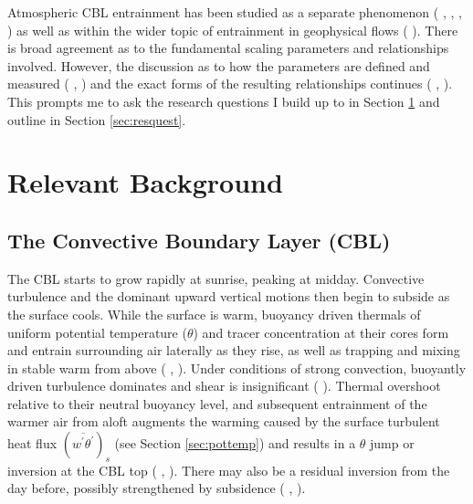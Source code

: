 Atmospheric \acs{CBL} entrainment has been studied as a separate phenomenon (\citeauthor{StullNelEl} \citeyear{StullNelEl}, \citeauthor{SullMoengStev} \citeyear{SullMoengStev}, \citeauthor{FedConzMir04} \citeyear{FedConzMir04}, \citeauthor{BrooksFowler2} \citeyear{BrooksFowler2}) as well as within the wider topic of entrainment in geophysical flows (\citeauthor{Turner86} \citeyear{Turner86}). There is broad agreement as to the fundamental scaling parameters and relationships involved.  However, the discussion as to how the parameters are defined and measured (\citeauthor{BrooksFowler2} \citeyear{BrooksFowler2}, \citeauthor{Traum11} \citeyear{Traum11}) and the exact forms of the resulting relationships continues (\citeauthor{SullMoengStev} \citeyear{SullMoengStev}, \citeauthor{FedConzMir04} \citeyear{FedConzMir04} \citeauthor{BrooksFowler2} \citeyear{BrooksFowler2}).  This prompts me to ask the research questions I build up to in Section \ref{sec:relback} and outline in Section \ref{sec:resquest}.


\section{Relevant Background}
\label{sec:relback}
\subsection{The Convective Boundary Layer (CBL)}

The \acs{CBL} starts to grow rapidly at sunrise, peaking at midday.  Convective turbulence and the dominant upward vertical motions then begin to subside as the surface cools.  While the surface is warm, buoyancy driven thermals of uniform potential temperature ($\theta$) and tracer concentration at their cores form and entrain surrounding air laterally as they rise, as well as trapping and mixing in stable warm from above (\citeauthor{Stull-BLMetIntro} \citeyear{Stull-BLMetIntro}, \citeauthor{CrumStullEl} \citeyear{CrumStullEl}).  Under conditions of strong convection, buoyantly driven turbulence dominates and shear is insignificant (\citeauthor{DirLEddy} \citeyear{DirLEddy}). Thermal overshoot relative to their neutral buoyancy level, and subsequent entrainment of the warmer air from aloft augments the warming caused by the surface turbulent heat flux $(\overline{w^{'}\theta^{'}})_{s}$ (see Section \ref{sec:pottemp}) and results in a $\theta$ jump or inversion at the \acs{CBL} top (\citeauthor{SchmidtSchu} \citeyear{SchmidtSchu}, \citeauthor{Turner86} \citeyear{Turner86}).  There may also be a residual inversion from the day before, possibly strengthened by subsidence (\citeauthor{Stull-BLMetIntro} \citeyear{Stull-BLMetIntro}, \citeauthor{SullMoengStev} \citeyear{SullMoengStev}).\\  

